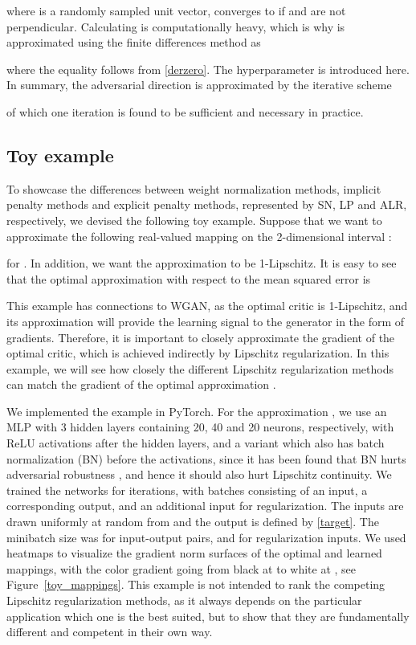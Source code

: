 \documentclass{article}
\begin{document}
where  is a randomly sampled unit vector, converges to  if  and  are not perpendicular. Calculating  is computationally heavy, which is why  is approximated using the finite differences method as

where the equality follows from \eqref{derzero}. The hyperparameter  is introduced here. In summary, the adversarial direction is approximated by the iterative scheme

of which one iteration is found to be sufficient and necessary in practice.

\subsection{Toy example} \label{toy_example}
To showcase the differences between weight normalization methods, implicit penalty methods and explicit penalty methods, represented by SN, LP and ALR, respectively, we devised the following toy example. Suppose that we want to approximate the following real-valued mapping on the 2-dimensional interval :

for . In addition, we want the approximation to be 1-Lipschitz. It is easy to see that the optimal approximation with respect to the mean squared error is


This example has connections to WGAN, as the optimal critic is 1-Lipschitz, and its approximation will provide the learning signal to the generator in the form of gradients. Therefore, it is important to closely approximate the gradient of the optimal critic, which is achieved indirectly by Lipschitz regularization. In this example, we will see how closely the different Lipschitz regularization methods can match the gradient of the optimal approximation . 

We implemented the example in PyTorch. For the approximation , we use an MLP with 3 hidden layers containing 20, 40 and 20 neurons, respectively, with ReLU activations after the hidden layers, and a variant which also has batch normalization (BN) before the activations, since it has been found that BN hurts adversarial robustness \citep{Gallowayetal2019}, and hence it should also hurt Lipschitz continuity. We trained the networks for  iterations, with batches consisting of an input, a corresponding output, and an additional input for regularization. The inputs are drawn uniformly at random from  and the output is defined by \eqref{target}. The minibatch size was  for input-output pairs, and  for regularization inputs. We used heatmaps to visualize the gradient norm surfaces of the optimal and learned mappings, with the color gradient going from black at  to white at , see Figure~\ref{toy_mappings}. This example is not intended to rank the competing Lipschitz regularization methods, as it always depends on the particular application which one is the best suited, but to show that they are fundamentally different and competent in their own way.
\end{document}
